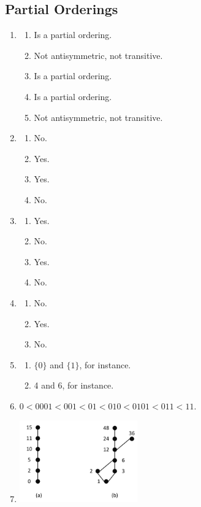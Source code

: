 \documentclass{sig-alternate-05-2015}
\begin{document}
\subsection{Partial Orderings}
\begin{enumerate}
\item 
\begin{enumerate}
	\item Is a partial ordering.
	\item Not antisymmetric, not transitive.
	\item Is a partial ordering.
	\item Is a partial ordering.
	\item Not antisymmetric, not transitive.
\end{enumerate}

\item 
\begin{enumerate}
	\item No.
	\item Yes.
	\item Yes.
	\item No.
\end{enumerate}

\item 
\begin{enumerate}
	\item Yes.
	\item No.
	\item Yes.
	\item No.
\end{enumerate}

\item 
\begin{enumerate}
	\item No.
	\item Yes.
	\item No.
\end{enumerate}

\item 
\begin{enumerate}
	\item $\{0\}$ and $\{1\}$, for instance.
	\item 4 and 6, for instance.
\end{enumerate}

\item $0 < 0001 < 001 < 01 < 010 < 0101 < 011 < 11$.

\item 
	\includegraphics[width=0.4\textwidth]{figs/252.pdf}
	

\end{enumerate}
\end{document}
